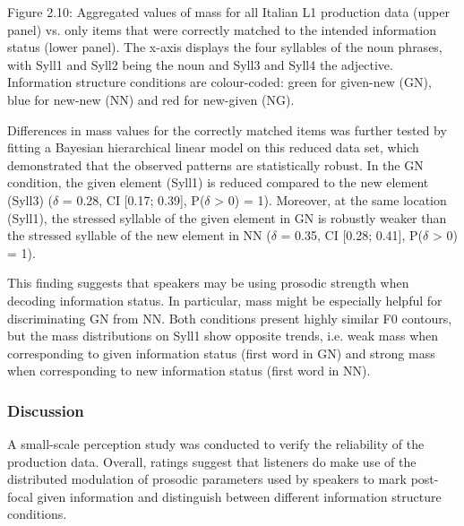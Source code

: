 \begin{styleStandard}
  [Warning: Image ignored] %
 
\end{styleStandard}

\begin{stylecaption}
Figure 2.10: Aggregated values of mass for all Italian L1 production data (upper panel) vs. only items that were correctly matched to the intended information status (lower panel). The x-axis displays the four syllables of the noun phrases, with Syll1 and Syll2 being the noun and Syll3 and Syll4 the adjective. Information structure conditions are colour-coded: green for given-new (GN), blue for new-new (NN) and red for new-given (NG).
\end{stylecaption}

\begin{styleStandard}
Differences in mass values for the correctly matched items was further tested by fitting a Bayesian hierarchical linear model on this reduced data set, which demonstrated that the observed patterns are statistically robust. In the GN condition, the given element (Syll1) is reduced compared to the new element (Syll3) ($\delta $ = 0.28, CI [0.17; 0.39], P($\delta $ {\textgreater} 0) = 1). Moreover, at the same location (Syll1), the stressed syllable of the given element in GN is robustly weaker than the stressed syllable of the new element in NN ($\delta $ = 0.35, CI [0.28; 0.41], P($\delta $ {\textgreater} 0) = 1).
\end{styleStandard}

\begin{styleStandard}
This finding suggests that speakers may be using prosodic strength when decoding information status. In particular, mass might be especially helpful for discriminating GN from NN. Both conditions present highly similar F0 contours, but the mass distributions on Syll1 show opposite trends, i.e. weak mass when corresponding to given information status (first word in GN) and strong mass when corresponding to new information status (first word in NN). 
\end{styleStandard}

\subsubsection{Discussion}
\hypertarget{Toc191305904}{}\begin{styleStandard}
A small-scale perception study was conducted to verify the reliability of the production data. Overall, ratings suggest that listeners do make use of the distributed modulation of prosodic parameters used by speakers to mark post-focal given information and distinguish between different information structure conditions.
\end{styleStandard}

